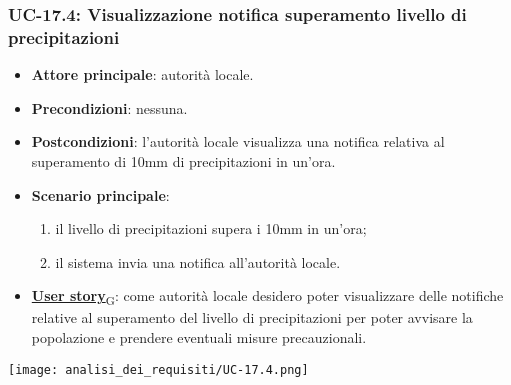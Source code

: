 \subsubsection{UC-17.4: Visualizzazione notifica superamento livello di precipitazioni}
\begin{itemize}
	\item \textbf{Attore principale}: autorità locale.
	\item \textbf{Precondizioni}: nessuna.
	\item \textbf{Postcondizioni}: l'autorità locale visualizza una notifica relativa al superamento di 10mm di precipitazioni in un'ora.
	\item \textbf{Scenario principale}:
	      \begin{enumerate}
		      \item il livello di precipitazioni supera i 10mm in un'ora;
		      \item il sistema invia una notifica all'autorità locale.
	      \end{enumerate}
	\item \href{https://7last.github.io/docs/pb/documentazione-interna/glossario\#user-story}{\textbf{User story}\textsubscript{G}}:
	      come autorità locale desidero poter visualizzare delle notifiche relative al superamento del livello di precipitazioni
	      per poter avvisare la popolazione e prendere eventuali misure precauzionali.
\end{itemize}
\begin{center}
	\texttt{[image: analisi\_dei\_requisiti/UC-17.4.png]}
\end{center}

